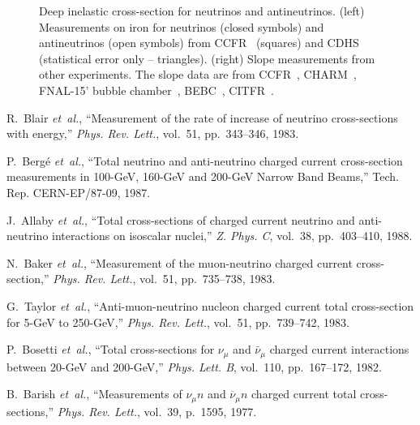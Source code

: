 \documentclass[a4paper,10pt]{article}
\begin{document}
\begin{figure}[htb]
	\caption{Deep inelastic cross-section for neutrinos and antineutrinos.
	(left) Measurements on iron for neutrinos (closed symbols) and
	antineutrinos (open symbols) from CCFR~\cite{Blair:1983su} (squares) and CDHS~\cite{Berge:1987zw} (statistical error only -- triangles).
	(right) Slope measurements from other experiments.
	The slope data are from CCFR~\cite{Blair:1983su},
	CHARM~\cite{Allaby:1987bb},
	FNAL-15' bubble chamber~\cite{Baker:1982jf,Taylor:1983qj},
	BEBC~\cite{Bosetti:1981ip},
	CITFR~\cite{Barish:1977ny}.
	}
\doclicenseThis
\end{figure}
%
%

\begin{thebibliography}{99}
R.~Blair {\em et~al.}, ``Measurement of the rate of increase of neutrino
  cross-sections with energy,'' {\em Phys. Rev. Lett.}, vol.~51, pp.~343--346,
  1983.

P.~Bergé {\em et~al.}, ``Total neutrino and anti-neutrino charged current
  cross-section measurements in {100-GeV, 160-GeV and 200-GeV Narrow Band
  Beams},'' Tech. Rep. CERN-EP/87-09, 1987.

J.~Allaby {\em et~al.}, ``Total cross-sections of charged current neutrino and
  anti-neutrino interactions on isoscalar nuclei,'' {\em Z. Phys. C}, vol.~38,
  pp.~403--410, 1988.

N.~Baker {\em et~al.}, ``Measurement of the muon-neutrino charged current
  cross-section,'' {\em Phys. Rev. Lett.}, vol.~51, pp.~735--738, 1983.

G.~Taylor {\em et~al.}, ``Anti-muon-neutrino nucleon charged current total
  cross-section for {5-GeV to 250-GeV},'' {\em Phys. Rev. Lett.}, vol.~51,
  pp.~739--742, 1983.

P.~Bosetti {\em et~al.}, ``Total cross-sections for $\nu_\mu$ and
  $\bar{\nu}_\mu$ charged current interactions between {20-GeV and 200-GeV},''
  {\em Phys. Lett. B}, vol.~110, pp.~167--172, 1982.

B.~Barish {\em et~al.}, ``Measurements of
  ${\ensuremath{\nu}}_{\ensuremath{\mu}}n$ and
  ${\overline{\ensuremath{\nu}}}_{\ensuremath{\mu}}n$ charged current total
  cross-sections,'' {\em Phys. Rev. Lett.}, vol.~39, p.~1595, 1977.
\end{thebibliography}
\end{document}
